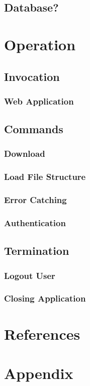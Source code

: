\documentclass{article}
\begin{document}
        \subsection{Database?}

    \section{Operation}
        \subsection{Invocation}
            \subsubsection{Web Application}

        \subsection{Commands}
            \subsubsection{Download}
            
            \subsubsection{Load File Structure}

            \subsubsection{Error Catching}

            \subsubsection{Authentication}

        \subsection{Termination}
            \subsubsection{Logout User}

            \subsubsection{Closing Application}

    \section*{References}

    \appendix
    \section{Appendix}
\end{document}
